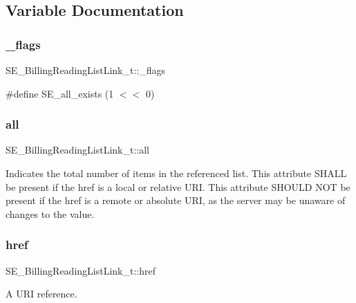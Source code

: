 \subsection{Variable Documentation}
\mbox{\label{group__BillingReadingListLink_ga37c4ee430c1db09cacc70d0bbde77104}} 
\subsubsection{\texorpdfstring{\+\_\+flags}{\_flags}}
{\footnotesize\ttfamily S\+E\+\_\+\+Billing\+Reading\+List\+Link\+\_\+t\+::\+\_\+flags}

\#define S\+E\+\_\+all\+\_\+exists (1 $<$$<$ 0) \mbox{\label{group__BillingReadingListLink_ga7785907289146a2a194d95384465e1d9}} 
\subsubsection{\texorpdfstring{all}{all}}
{\footnotesize\ttfamily S\+E\+\_\+\+Billing\+Reading\+List\+Link\+\_\+t\+::all}

Indicates the total number of items in the referenced list. This attribute S\+H\+A\+LL be present if the href is a local or relative U\+RI. This attribute S\+H\+O\+U\+LD N\+OT be present if the href is a remote or absolute U\+RI, as the server may be unaware of changes to the value. \mbox{\label{group__BillingReadingListLink_ga20c5e48e638d31cf9928d4804385b494}} 
\subsubsection{\texorpdfstring{href}{href}}
{\footnotesize\ttfamily S\+E\+\_\+\+Billing\+Reading\+List\+Link\+\_\+t\+::href}

A U\+RI reference. 